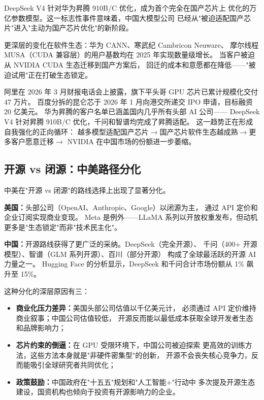 DeepSeek V4 针对华为昇腾 910B/C 优化，成为首个完全在国产芯片上
优化的万亿参数模型。这一标志性事件意味着，中国大模型公司
已经从"被迫适配国产芯片"进入"主动为国产芯片优化"的新阶段。

更深层的变化在软件生态：华为 CANN、寒武纪 Cambricon Neuware、
摩尔线程 MUSA（CUDA 兼容层）的用户基数均在 2025 年实现数量级增长。
当客户被迫从 NVIDIA CUDA 生态迁移到国产方案后，
回迁的成本和意愿都在降低——"被迫试用"正在打破生态锁定。

阿里在 2026 年 3 月财报电话会上披露，旗下平头哥 GPU 芯片已累计规模化交付 47 万片。
百度分拆的昆仑芯于 2026 年 1 月向港交所递交 IPO 申请，目标融资 20 亿美元。
华为昇腾的客户名单已涵盖国内几乎所有头部 AI 公司——
DeepSeek V4 针对昇腾 910B/C 优化，千问和智谱均完成了昇腾适配。
这一趋势正在形成自我强化的正向循环：
越多模型适配国产芯片$\to$国产芯片软件生态越成熟$\to$更多客户愿意迁移$\to$
NVIDIA 在中国市场的份额进一步萎缩。

\subsection{开源 vs 闭源：中美路径分化}
\label{subsec:china-open-vs-closed}

中美在"开源 vs 闭源"的路线选择上出现了显著分化。

\textbf{美国：}头部公司（OpenAI、Anthropic、Google）以闭源为主，
通过 API 定价和企业订阅实现商业变现。
Meta 是例外——LLaMA 系列以开放权重发布，但动机更多是"生态锁定"而非"技术民主化"。

\textbf{中国：}开源路线获得了更广泛的采纳。DeepSeek（完全开源）、
千问（400+ 开源模型）、智谱（GLM 系列开源）、百川（部分开源）
构成了全球最活跃的开源 AI 力量之一。
Hugging Face 的分析显示，DeepSeek 和千问合计市场份额从 1\% 飙升至 15\%。

这种分化的深层原因有三：

\begin{itemize}
  \item \textbf{商业化压力差异：}美国头部公司估值以千亿美元计，
    必须通过 API 定价维持商业叙事；中国公司估值较低，
    开源反而能以最低成本获取全球开发者生态和品牌影响力；
  \item \textbf{芯片约束的倒逼：}在 GPU 受限环境下，中国公司被迫探索
    更高效的训练方法，这些方法本身就是"非硬件密集型"的创新，
    开源不会丧失核心竞争力，反而能吸引全球研究者共同优化；
  \item \textbf{政策鼓励：}中国政府在"十五五"规划和"人工智能+"行动中
    多次提及开源生态建设，国资机构也倾向于投资有开源影响力的企业。
\end{itemize}

